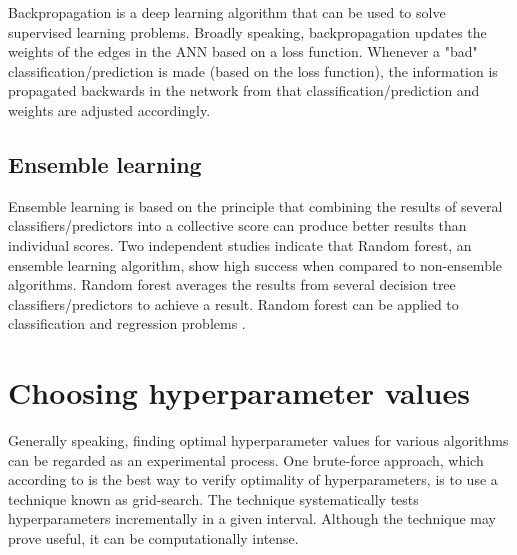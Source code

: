 			Backpropagation is a deep learning algorithm that can be used to solve supervised learning problems. Broadly speaking, backpropagation updates the weights of the edges in the ANN based on a loss function. Whenever a "bad" classification/prediction is made (based on the loss function), the information is propagated backwards in the network from that classification/prediction and weights are adjusted accordingly.

	\subsection{Ensemble learning}
		Ensemble learning is based on the principle that combining the results of several classifiers/predictors into a collective score can produce better results than individual scores. Two independent studies indicate that Random forest, an ensemble learning algorithm, show high success when compared to non-ensemble algorithms\cite{ARTICLE:16, IP:5}. %
		Random forest averages the results from several decision tree classifiers/predictors to achieve a result. Random forest can be applied to classification and regression problems \cite{WEBSITE:17}.

\section{Choosing hyperparameter values} \label{sec:hyperparameters}
	Generally speaking, finding optimal hyperparameter values for various algorithms can be regarded as an experimental process. One brute-force approach, which according to \cite{BOOK:9} is the best way to verify optimality of hyperparameters, is to use a technique known as grid-search. The technique systematically tests hyperparameters incrementally in a given interval. Although the technique may prove useful, it can be computationally intense.



